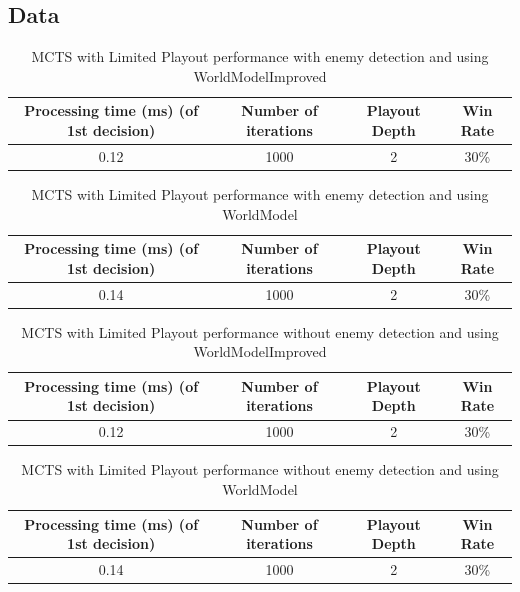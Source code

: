 \documentclass{article}
\begin{document}
  \subsection{Data}
  \begin{table}[h!]
    \centering
    \caption{MCTS with Limited Playout performance with enemy detection and using WorldModelImproved}
    \label{tab:tableLimitedMCTS1}
    \begin{tabular}{c|c|c|c}
      \textbf{Processing time (ms) (of 1st decision)} & \textbf{Number of iterations} & \textbf{Playout Depth} & \textbf{Win Rate}\\
      \hline
      0.12 & 1000 & 2 & 30\%
    \end{tabular}
  \end{table}
  \begin{table}[h!]
    \centering
    \caption{MCTS with Limited Playout performance with enemy detection and using WorldModel}
    \label{tab:tableLimitedMCTS2}
    \begin{tabular}{c|c|c|c}
      \textbf{Processing time (ms) (of 1st decision)} & \textbf{Number of iterations} & \textbf{Playout Depth} & \textbf{Win Rate}\\
      \hline
      0.14 & 1000 & 2 & 30\%
    \end{tabular}
  \end{table}
  \begin{table}[h!]
    \centering
    \caption{MCTS with Limited Playout performance without enemy detection and using WorldModelImproved}
    \label{tab:tableLimitedMCTS3}
    \begin{tabular}{c|c|c|c}
      \textbf{Processing time (ms) (of 1st decision)} & \textbf{Number of iterations} & \textbf{Playout Depth} & \textbf{Win Rate}\\
      \hline
      0.12 & 1000 & 2 & 30\%
    \end{tabular}
  \end{table}
  \begin{table}[h!]
    \centering
    \caption{MCTS with Limited Playout performance without enemy detection and using WorldModel}
    \label{tab:tableLimitedMCTS4}
    \begin{tabular}{c|c|c|c}
      \textbf{Processing time (ms) (of 1st decision)} & \textbf{Number of iterations} & \textbf{Playout Depth} & \textbf{Win Rate}\\
      \hline
      0.14 & 1000 & 2 & 30\%
    \end{tabular}
  \end{table}
\end{document}
